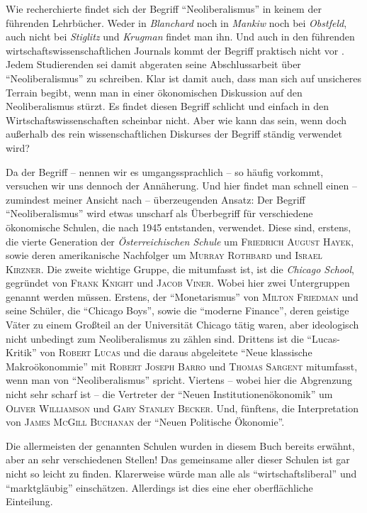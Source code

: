 Wie \textcite[S. 179]{Venugopal2015} recherchierte findet sich der Begriff "`Neoliberalismus"' in keinem der führenden Lehrbücher. Weder in \textit{Blanchard} noch in \textit{Mankiw} noch bei \textit{Obstfeld}, auch nicht bei \textit{Stiglitz} und \textit{Krugman} findet man ihn. Und auch in den führenden wirtschaftswissenschaftlichen Journals kommt der Begriff praktisch nicht vor \parencite[S. 179]{Venugopal2015}. Jedem Studierenden sei damit abgeraten seine Abschlussarbeit über "`Neoliberalismus"' zu schreiben. Klar ist damit auch, dass man sich auf unsicheres Terrain begibt, wenn man in einer ökonomischen Diskussion auf den Neoliberalismus stürzt. Es findet diesen Begriff schlicht und einfach in den Wirtschaftswissenschaften scheinbar nicht. Aber wie kann das sein, wenn doch außerhalb des rein wissenschaftlichen Diskurses der Begriff ständig verwendet wird?

Da der Begriff -- nennen wir es umgangssprachlich -- so häufig vorkommt, versuchen wir uns dennoch der Annäherung. Und hier findet man schnell einen -- zumindest meiner Ansicht nach -- überzeugenden Ansatz: Der Begriff "`Neoliberalismus"' wird etwas unscharf als Überbegriff für verschiedene ökonomische Schulen, die nach 1945 entstanden, verwendet. Diese sind, erstens, die vierte Generation der \textit{Österreichischen Schule} um \textsc{Friedrich August Hayek}, sowie deren amerikanische Nachfolger um \textsc{Murray Rothbard} und \textsc{Israel Kirzner}. Die zweite wichtige Gruppe, die mitumfasst ist, ist die \textit{Chicago School}, gegründet von \textsc{Frank Knight} und \textsc{Jacob Viner}. Wobei hier zwei Untergruppen genannt werden müssen. Erstens, der "`Monetarismus"' von \textsc{Milton Friedman} und seine Schüler, die "`Chicago Boys"', sowie die "`moderne Finance"', deren geistige Väter zu einem Großteil an der Universität Chicago tätig waren, aber ideologisch nicht unbedingt zum Neoliberalismus zu zählen sind. Drittens ist die "`Lucas-Kritik"' von \textsc{Robert Lucas} und die daraus abgeleitete "`Neue klassische Makroökonommie"' mit \textsc{Robert Joseph Barro} und \textsc{Thomas Sargent}  mitumfasst, wenn man von "`Neoliberalismus"' spricht. Viertens -- wobei hier die Abgrenzung nicht sehr scharf ist -- die Vertreter der "`Neuen Institutionenökonomik"' um \textsc{Oliver Williamson} und \textsc{Gary Stanley Becker}. Und, fünftens, die Interpretation von \textsc{James McGill Buchanan} der  "`Neuen Politische Ökonomie"'.

Die allermeisten der genannten Schulen wurden in diesem Buch bereits erwähnt, aber an sehr verschiedenen Stellen! Das gemeinsame aller dieser Schulen ist gar nicht so leicht zu finden. Klarerweise würde man alle als "`wirtschaftsliberal"' und  "`marktgläubig"' einschätzen. Allerdings ist dies eine eher oberflächliche Einteilung.


